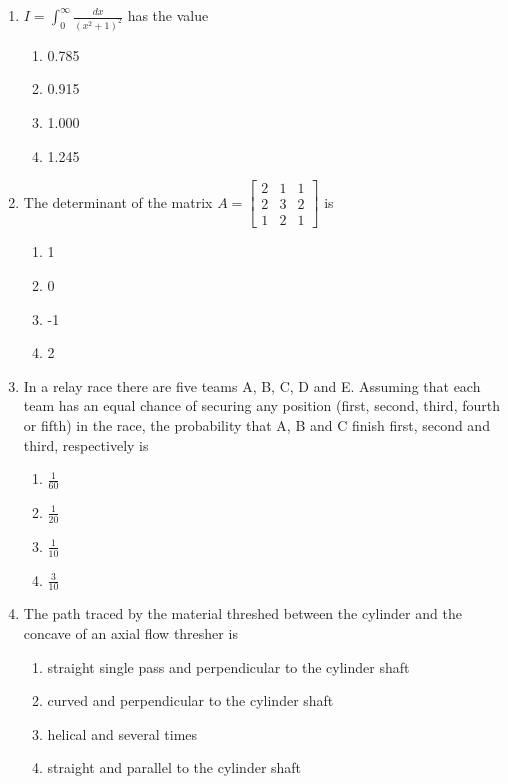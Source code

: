 \documentclass[12pt]{article}
\begin{document}
\begin{enumerate}[label=Q.\arabic*]
	\item $I = \int_{0}^{\infty} \frac{dx}{(x^2 + 1)^{2}}$ has the value
		\begin{multicols}{4}
			\begin{enumerate}[label=(\Alph*)]
				\item 0.785
				\item 0.915
				\item 1.000
				\item 1.245
			\end{enumerate}
		\end{multicols}

	\item The determinant of the matrix $A = \begin{bmatrix} 2 & 1 & 1 \\ 2 & 3 & 2 \\ 1 & 2 & 1 \end{bmatrix}$ is
			\begin{multicols}{4}
				\begin{enumerate}[label=(\Alph*)]
					\item 1
					\item 0
					\item -1
					\item 2
				\end{enumerate}
			\end{multicols}

		\item In a relay race there are five teams A, B, C, D and E. Assuming that each team has an equal chance of securing any position (first, second, third, fourth or fifth) in the race, the probability that A, B and C finish first, second and third, respectively is
			\begin{multicols}{4}
				\begin{enumerate}[label=(\Alph*)]
					\item $\frac{1}{60}$
					\item $\frac{1}{20}$
					\item $\frac{1}{10}$
					\item $\frac{3}{10}$
				\end{enumerate}
			\end{multicols}

		\item The path traced by the material threshed between the cylinder and the concave of an axial flow thresher is
			\begin{enumerate}[label=(\Alph*)]
				\item straight single pass and perpendicular to the cylinder shaft
				\item curved and perpendicular to the cylinder shaft
				\item helical and several times
				\item straight and parallel to the cylinder shaft
			\end{enumerate}


\end{enumerate}
\end{document}
